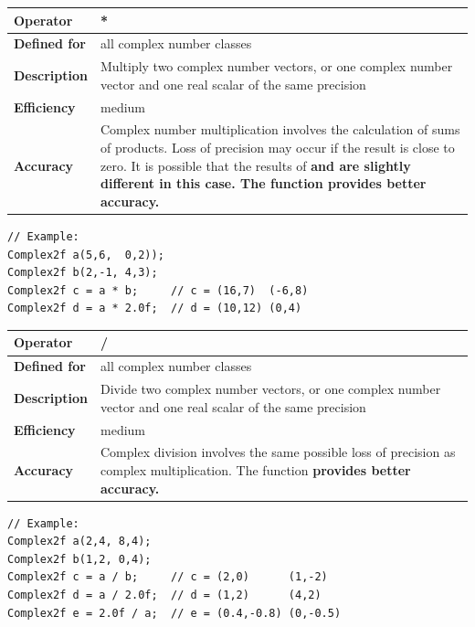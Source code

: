 \documentclass[11pt,a4paper,oneside,openright]{report}
\newcommand{\vspacesmall}{\vspace{3mm}}
\newcommand{\vspacebig}{\vspace{6mm}}
\newcommand{\codei}[1]{\bfseries \ttfamily{#1}\normalfont}
\begin{document}
\begin{tabular}{|p{25mm}|p{100mm}|}
\hline
\bfseries Operator & * \\ \hline
\bfseries Defined for & all complex number classes  \\ \hline
\bfseries Description & Multiply two complex number vectors, or one complex number vector and one real scalar of the same precision \\ \hline
\bfseries Efficiency & medium \\ \hline
\bfseries Accuracy & Complex number multiplication involves the calculation of sums of products. Loss of precision may occur if the result is close to zero. It is possible that the results of \codei{a * b} and \codei{b * a} are slightly different in this case. The function \codei{mul\_accurate} provides better accuracy.\\ \hline
\end{tabular}
\vspacesmall

\begin{lstlisting}[frame=none]
// Example:
Complex2f a(5,6,  0,2));
Complex2f b(2,-1, 4,3);
Complex2f c = a * b;     // c = (16,7)  (-6,8)
Complex2f d = a * 2.0f;  // d = (10,12) (0,4)
\end{lstlisting}
\vspacebig


\begin{tabular}{|p{25mm}|p{100mm}|}
\hline
\bfseries Operator & / \\ \hline
\bfseries Defined for & all complex number classes  \\ \hline
\bfseries Description & Divide two complex number vectors, or one complex number vector and one real scalar of the same precision \\ \hline
\bfseries Efficiency & medium \\ \hline
\bfseries Accuracy & Complex division involves the same possible  loss of precision as complex multiplication. The function \codei{div\_accurate} provides better accuracy.\\ \hline

\end{tabular}
\vspacesmall

\begin{lstlisting}[frame=none]
// Example:
Complex2f a(2,4, 8,4);
Complex2f b(1,2, 0,4);
Complex2f c = a / b;     // c = (2,0)      (1,-2)
Complex2f d = a / 2.0f;  // d = (1,2)      (4,2)
Complex2f e = 2.0f / a;  // e = (0.4,-0.8) (0,-0.5)
\end{lstlisting}
\vspacebig
\end{document}
